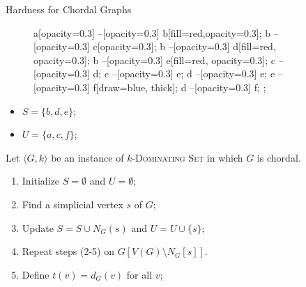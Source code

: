 \documentclass[10pt,aspectratio=169,english]{beamer}
\begin{document}
\begin{frame}{Hardness for Chordal Graphs}
\begin{minipage}[c]{0.50\textwidth}
{\begin{figure}
{					a[opacity=0.3] --[opacity=0.3] b[fill=red,opacity=0.3];
					b --[opacity=0.3] c[opacity=0.3];
					b --[opacity=0.3] d[fill=red, opacity=0.3];
					b --[opacity=0.3] e[fill=red, opacity=0.3];
					c --[opacity=0.3] d;
					c --[opacity=0.3] e;
					d --[opacity=0.3] e;
					e --[opacity=0.3] f[draw=blue, thick];
					d --[opacity=0.3] f;
				};		
			\end{figure}
			\begin{itemize}
				\item $S = \{b, d, e\}$;
				\item $U = \{a, c, f\}$;
			\end{itemize}
		}
	\end{minipage}\begin{minipage}[c]{0.50\textwidth}
		Let $\langle G, k \rangle$ be an instance of \textsc{$k$-Dominating Set} in which $G$ is chordal.
		\begin{enumerate}
			\item Initialize $S = \emptyset$ and $U = \emptyset$;
			\item Find a simplicial vertex $s$ of $G$;
			\item Update $S = S \cup N_G(s)$ and $U = U \cup \{s\}$;
			\item Repeat steps (2-5) on $G[V(G) \setminus N_G[s]]$.
			\item Define $t(v) = d_G(v)$ for all $v$;
		\end{enumerate}
	\end{minipage}
	
\end{frame}
\end{document}
